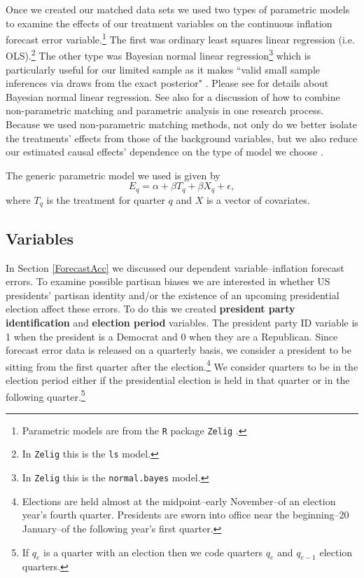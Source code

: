 \documentclass[a4paper]{article}\usepackage{graphicx, color}
\begin{document}
Once we created our matched data sets we used two types of parametric models to examine the effects of our treatment variables on the continuous inflation forecast error variable.\footnote{Parametric models are from the \texttt{R} package \texttt{Zelig} \citep{Zelig2012}.} The first was ordinary least squares linear regression (i.e. OLS).\footnote{In {\tt{Zelig}} this is the {\tt{ls}} model.} The other type was Bayesian normal linear regression\footnote{In {\tt{Zelig}} this is the {\tt{normal.bayes}} model.} which is particularly useful for our limited sample as it makes ``valid small sample inferences via draws from the exact posterior" \citep[][38]{Zelig2012}. Please see \cite{Goodrich2007} for details about Bayesian normal linear regression.  See also \cite{Imai2008} for a discussion of how to combine non-parametric matching and parametric analysis in one research process. Because we used non-parametric matching methods, not only do we better isolate the treatments' effects from those of the background variables, but we also reduce our estimated causal effects' dependence on the type of model we choose \cite[200--201]{Ho2007}.

The generic parametric model we used is given by
%
\begin{equation}
    E_{q} = \alpha + \beta T_{q} + \beta X_{q} + \epsilon,
\end{equation}
%
where $T_{q}$ is the treatment for quarter $q$ and $X$ is a vector of covariates. 

\subsection{Variables}

In Section \ref{ForecastAcc} we discussed our dependent variable--inflation forecast errors. To examine possible partisan biases we are interested in whether US presidents' partisan identity and/or the existence of an upcoming presidential election affect these errors. To do this we created {\bf{president party identification}} and {\bf{election period}} variables. The president party ID variable is 1 when the president is a Democrat and 0 when they are a Republican. Since forecast error data is released on a quarterly basis, we consider a president to be sitting from the first quarter after the election.\footnote{Elections are held almost at the midpoint--early November--of an election year's fourth quarter. Presidents are sworn into office near the beginning--20 January--of the following year's first quarter.} We consider quarters to be in the election period either if the presidential election is held in that quarter or in the following quarter.\footnote{If $q_{e}$ is a quarter with an election then we code quarters $q_{e}$ and $q_{e-1}$ election quarters.}
\end{document}
